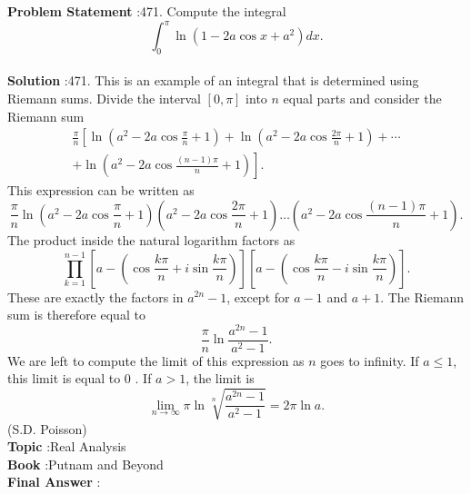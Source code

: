 \documentclass[10pt]{article}
\begin{document}
\textbf{Problem Statement} :471. Compute the integral$$ \int_{0}^{\pi} \ln \left(1-2 a \cos x+a^{2}\right) d x . $$\\
\textbf{Solution} :471. This is an example of an integral that is determined using Riemann sums. Divide the interval $[0, \pi]$ into $n$ equal parts and consider the Riemann sum$$ \begin{array}{r} \frac{\pi}{n}\left[\ln \left(a^{2}-2 a \cos \frac{\pi}{n}+1\right)+\ln \left(a^{2}-2 a \cos \frac{2 \pi}{n}+1\right)+\cdots\right. \\ \left.+\ln \left(a^{2}-2 a \cos \frac{(n-1) \pi}{n}+1\right)\right] . \end{array} $$This expression can be written as$$ \frac{\pi}{n} \ln \left(a^{2}-2 a \cos \frac{\pi}{n}+1\right)\left(a^{2}-2 a \cos \frac{2 \pi}{n}+1\right) \ldots\left(a^{2}-2 a \cos \frac{(n-1) \pi}{n}+1\right) . $$The product inside the natural logarithm factors as$$ \prod_{k=1}^{n-1}\left[a-\left(\cos \frac{k \pi}{n}+i \sin \frac{k \pi}{n}\right)\right]\left[a-\left(\cos \frac{k \pi}{n}-i \sin \frac{k \pi}{n}\right)\right] . $$These are exactly the factors in $a^{2 n}-1$, except for $a-1$ and $a+1$. The Riemann sum is therefore equal to$$ \frac{\pi}{n} \ln \frac{a^{2 n}-1}{a^{2}-1} . $$We are left to compute the limit of this expression as $n$ goes to infinity. If $a \leq 1$, this limit is equal to 0 . If $a>1$, the limit is$$ \lim _{n \rightarrow \infty} \pi \ln \sqrt[n]{\frac{a^{2 n}-1}{a^{2}-1}}=2 \pi \ln a . $$(S.D. Poisson)\\
\textbf{Topic} :Real Analysis\\
\textbf{Book} :Putnam and Beyond\\
\textbf{Final Answer} :\\
\end{document}
